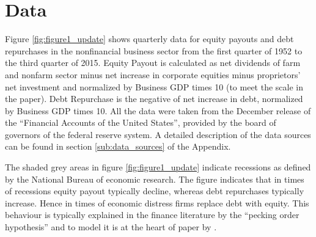 \section{Data}
\label{sec:data}

Figure \ref{fig:figure1_update} shows quarterly data for equity payouts and
debt repurchases in the nonfinancial business sector from the first quarter of
1952 to the third quarter of 2015. Equity Payout is calculated as net
dividends of farm and nonfarm sector minus net increase in corporate equities
minus proprietors’ net investment and normalized by Business GDP times 10 (to
meet the scale in the paper). Debt Repurchase is the negative of net increase in
debt, normalized by Business GDP times 10. All the data were taken from the
December release of the ``Financial Accounts of the United States'', provided
by the board of governors of the federal reserve system. A detailed description
of the data sources can be found in section \ref{sub:data_sources} of the
Appendix. 



The shaded grey areas in figure \ref{fig:figure1_update} indicate recessions as
defined by the National Bureau of economic research. The figure indicates that
in times of recessions equity payout typically decline, whereas debt
repurchases typically increase. Hence in times of economic distress firms
replace debt with equity. This behaviour is typically explained in the finance
literature by the ``pecking order hypothesis'' \parencite{myers_capital_1984} and to
model it is at the heart of paper by \textcite{jerman_macroeconomic_2012}.
